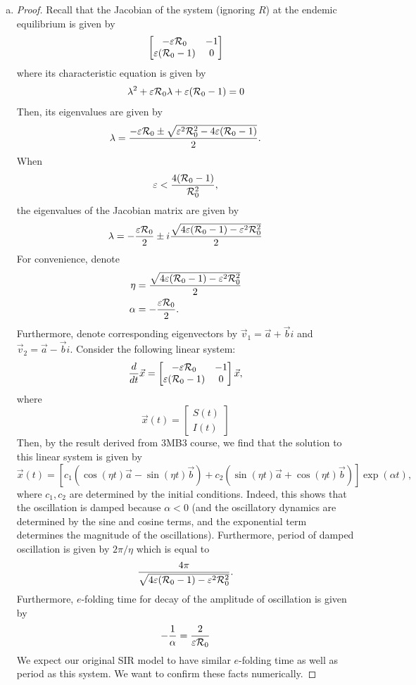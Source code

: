 \documentclass[12pt]{article}\usepackage[]{graphicx}\usepackage[]{color}
\begin{document}
\begin{enumerate}[(a)]
\item \SIRi
{\color{blue}\begin{proof}{\color{magenta}
Recall that the Jacobian of the system (ignoring $R$) at the endemic equilibrium is given by
$$
\begin{bmatrix}
- \varepsilon {\cal R}_0 & - 1 \\
\varepsilon ({\cal R}_0 - 1) & 0
\end{bmatrix}
$$
where its characteristic equation is given by
$$
\lambda^2 + \varepsilon {\cal R}_0 \lambda + \varepsilon({\cal R}_0 - 1) = 0
$$
Then, its eigenvalues are given by
$$
\lambda = \frac{-\varepsilon {\cal R}_0 \pm \sqrt{\varepsilon^2 {\cal R}_0^2 - 4 \varepsilon({\cal R}_0 - 1)}}{2}.
$$
When
$$
\varepsilon < \frac{4 ({\cal R}_0 - 1)}{{\cal R}_0^2},
$$
the eigenvalues of the Jacobian matrix are given by
$$
\lambda = -\frac{\varepsilon {\cal R}_0}{2} \pm i \frac{\sqrt{4 \varepsilon ({\cal R}_0 - 1) - \varepsilon^2 {\cal R}_0^2}}{2}
$$
For convenience, denote
$$
\begin{aligned}
\eta &= \frac{\sqrt{4 \varepsilon ({\cal R}_0 - 1) - \varepsilon^2 {\cal R}_0^2}}{2}\\
\alpha &= -\frac{\varepsilon {\cal R}_0}{2}.
\end{aligned}
$$
Furthermore, denote corresponding eigenvectors by $\vec{v}_1 = \vec{a} + \vec{b} i$ and $\vec{v}_2 = \vec{a} - \vec{b} i$.
Consider the following linear system:
$$
\frac{d}{dt} \vec{x} = \begin{bmatrix}
- \varepsilon {\cal R}_0 & - 1 \\
\varepsilon ({\cal R}_0 - 1) & 0
\end{bmatrix} \vec{x},
$$
where
$$
\vec{x}(t) = \begin{bmatrix}
S(t)\\
I(t)
\end{bmatrix}
$$
Then, by the result derived from 3MB3 course, we find that the solution to this linear system is given by
$$
\vec{x}(t) = \left[c_1 \left(\cos (\eta t) \vec{a} - \sin (\eta t) \vec{b} \right) + c_2 \left(\sin (\eta t) \vec{a} + \cos (\eta t) \vec{b} \right)  \right] \exp(\alpha t),
$$
where $c_1, c_2$ are determined by the initial conditions.
Indeed, this shows that the oscillation is damped because $\alpha < 0$ (and the oscillatory dynamics are determined by the sine and cosine terms, and the exponential term determines the magnitude of the oscillations). Furthermore, period of damped oscillation is given by $2\pi/\eta$ which is equal to
$$
\frac{4\pi}{\sqrt{4 \varepsilon ({\cal R}_0 - 1) - \varepsilon^2 {\cal R}_0^2}}.
$$
Furthermore, $e$-folding time for decay of the amplitude of oscillation is given by
$$
-\frac{1}{\alpha} = \frac{2}{\varepsilon {\cal R}_0}
$$
We expect our original SIR model to have similar $e$-folding time as well as period as this system.
We want to confirm these facts numerically.

}
\end{proof}}
\end{enumerate}
\end{document}
